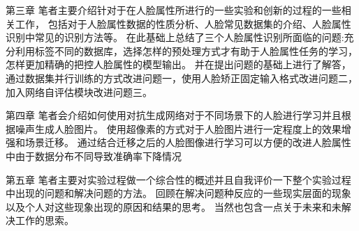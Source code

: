 第三章
笔者主要介绍针对于在人脸属性所进行的一些实验和创新的过程的一些相关工作，
包括对于人脸属性数据的性质分析、人脸常见数据集的介绍、人脸属性识别中常见的识别方法等。
在此基础上总结了三个人脸属性识别所面临的问题:充分利用标签不同的数据库，选择怎样的预处理方式才有助于人脸属性任务的学习，怎样更加精确的把控人脸属性的模型输出。
并在提出问题的基础上进行了解答，通过数据集并行训练的方式改进问题一，使用人脸矫正固定输入格式改进问题二，加入网络自评估模块改进问题三。

第四章
笔者会介绍如何使用对抗生成网络对于不同场景下的人脸进行学习并且根据噪声生成人脸图片。
使用超像素的方式对于人脸图片进行一定程度上的效果增强和场景迁移。
通过结合迁移之后的人脸图像进行学习可以方便的改进人脸属性中由于数据分布不同导致准确率下降情况

第五章
笔者主要对实验过程做一个综合性的概述并且自我评价一下整个实验过程中出现的问题和解决问题的方法。
回顾在解决问题种反应的一些现实层面的现象以及个人对这些现象出现的原因和结果的思考。
当然也包含一点关于未来和未解决工作的思索。
